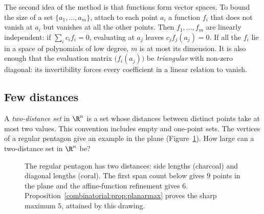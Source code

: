 The second idea of the method is that functions form vector spaces. To bound the size of a set $\{a_1,\dots,a_m\}$, attach to each point $a_i$ a function $f_i$ that does not vanish at
$a_i$ but vanishes at all the other points. Then $f_1,\dots,f_m$ are linearly independent: if $\sum_ic_if_i=0$, evaluating at $a_j$ leaves $c_jf_j(a_j)=0$. If all the $f_i$ lie in a
space of polynomials of low degree, $m$ is at most its dimension. It is also enough that the evaluation matrix
$\bigl(f_i(a_j)\bigr)$ be \emph{triangular} with non-zero diagonal:
its invertibility forces every coefficient in a linear relation to vanish.

\subsection*{Few distances}

A \emph{two-distance set} in $\R^n$ is a set whose distances between distinct
points take at most two values. This convention includes empty and one-point
sets. The vertices of a regular pentagon give an example in the plane (Figure~\ref{combinatorial:fig:pentagon}).
How large can a two-distance set in $\R^n$ be?

\begin{figure}[ht]
\centering
{}
\caption{The regular pentagon has two distances: side lengths (charcoal)
and diagonal lengths (coral). The first span count below gives $9$ points
in the plane and the affine-function refinement gives $6$.
Proposition~\ref{combinatorial:prop:planarmax} proves the sharp maximum $5$,
attained by this drawing.}
\label{combinatorial:fig:pentagon}
\end{figure}

